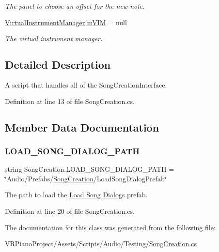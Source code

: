 \begin{DoxyCompactItemize}
\begin{DoxyCompactList}\small\item\em The panel to choose an offset for the new note. \end{DoxyCompactList}\item 
\hyperlink{class_virtual_instrument_manager}{Virtual\+Instrument\+Manager} \hyperlink{group___s_c_priv_var_ga1bad472098eec4194c5b18e7b3ccfd94}{m\+V\+IM} = null
\begin{DoxyCompactList}\small\item\em The virtual instrument manager. \end{DoxyCompactList}\end{DoxyCompactItemize}


\subsection{Detailed Description}
A script that handles all of the Song\+Creation\+Interface. 

Definition at line 13 of file Song\+Creation.\+cs.



\subsection{Member Data Documentation}
\mbox{\label{class_song_creation_a1e30986ba2a7d3329425b160d54b3dc7}} 
\subsubsection{\texorpdfstring{L\+O\+A\+D\+\_\+\+S\+O\+N\+G\+\_\+\+D\+I\+A\+L\+O\+G\+\_\+\+P\+A\+TH}{LOAD\_SONG\_DIALOG\_PATH}}
{\footnotesize\ttfamily string Song\+Creation.\+L\+O\+A\+D\+\_\+\+S\+O\+N\+G\+\_\+\+D\+I\+A\+L\+O\+G\+\_\+\+P\+A\+TH = \char`\"{}Audio/Prefabs/\hyperlink{class_song_creation}{Song\+Creation}/Load\+Song\+Dialog\+Prefab\char`\"{}\hspace{0.3cm}{\ttfamily [private]}}



The path to load the \hyperlink{}{Load Song Dialog}\textquotesingle{}s prefab. 



Definition at line 20 of file Song\+Creation.\+cs.



The documentation for this class was generated from the following file\+:\begin{DoxyCompactItemize}
\item 
V\+R\+Piano\+Project/\+Assets/\+Scripts/\+Audio/\+Testing/\hyperlink{_song_creation_8cs}{Song\+Creation.\+cs}\end{DoxyCompactItemize}
